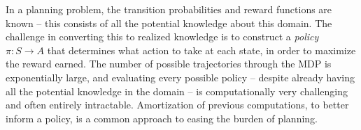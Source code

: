 In a planning problem, the transition probabilities and reward functions are known -- this consists of all the potential knowledge about this domain. The challenge in converting this to realized knowledge is to construct a \textit{policy} $\pi: S \rightarrow A$ that determines what action to take at each state, in order to maximize the reward earned. The number of possible trajectories through the MDP is exponentially large, and evaluating every possible policy -- despite already having all the potential knowledge in the domain -- is computationally very challenging and often entirely intractable. Amortization of previous computations, to better inform a policy, is a common approach to easing the burden of planning.



